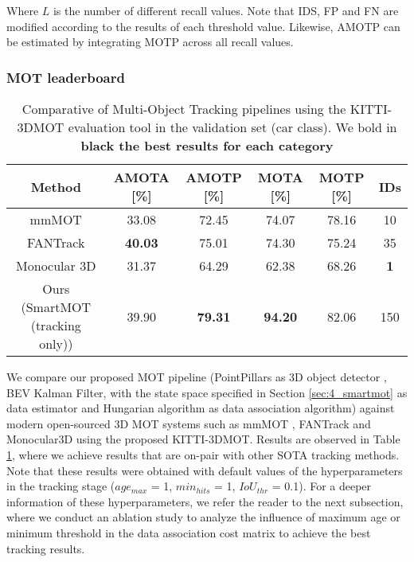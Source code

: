 Where $L$ is the number of different recall values. Note that IDS, FP and FN are modified according to the results of each threshold value. Likewise, AMOTP can be estimated by integrating MOTP across all recall values.

\subsubsection{MOT leaderboard}
\label{subsubsec:4_mot_leaderboard}

\begin{table}[h]
	\caption{Comparative of Multi-Object Tracking pipelines using the KITTI-3DMOT evaluation tool in the validation set (car class). We bold in \bf{black} the best results for each category}
	\label{table:4_MOT_pipelines_validation}
	\begin{center}
		\begin{tabular}{c | ccccc}
			\toprule
			Method & AMOTA [\%] &  AMOTP [\%] &  MOTA [\%] &  MOTP [\%] & IDs \\
			\midrule
			mmMOT \cite{zhang2019robust} & 33.08 & 72.45 & 74.07 & 78.16 & 10  \\
			FANTrack \cite{baser2019fantrack} & \bf{40.03} & 75.01 & 74.30 & 75.24 & 35 \\
			Monocular 3D \cite{weng2019monocular} & 31.37 & 64.29 & 62.38 & 68.26 & \bf{1} \\
			\midrule
			Ours (SmartMOT \cite{gomez2021smartmot} (tracking only)) & 39.90 & \bf{79.31} & \bf{94.20} & 82.06 & 150 \\ 
			\bottomrule
		\end{tabular}
	\end{center}
\end{table}

We compare our proposed \ac{MOT} pipeline (PointPillars as 3D object detector \cite{lang2019pointpillars}, \ac{BEV} Kalman Filter, with the state space specified in Section \ref{sec:4_smartmot} as data estimator and Hungarian algorithm as data association algorithm) against modern open-sourced 3D MOT systems such as mmMOT \cite{zhang2019robust}, FANTrack \cite{baser2019fantrack} and Monocular3D \cite{weng2019monocular} using the proposed KITTI-3DMOT. Results are observed in Table \ref{table:4_MOT_pipelines_validation}, where we achieve results that are on-pair with other \ac{SOTA} tracking methods. Note that these results were obtained with default values of the hyperparameters in the tracking stage ($age_{max}$ = 1, $min_{hits}$ = 1, $IoU_{thr}$ = 0.1). For a deeper information of these hyperparameters, we refer the reader to the next subsection, where we conduct an ablation study to analyze the influence of maximum age or minimum threshold in the data association cost matrix to achieve the best tracking results.

